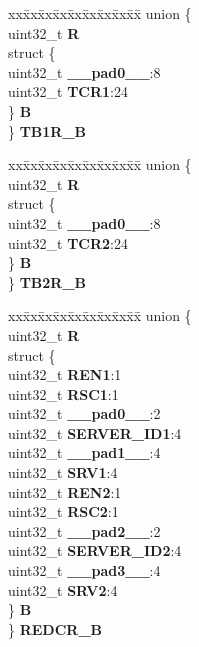 \begin{DoxyCompactItemize}
\begin{tabbing}
\end{tabbing}\item 
\mbox{\label{structETPU__tag_ad5892b6d556deb2c828895ad82ed16f2}} 
\begin{tabbing}
xx\=xx\=xx\=xx\=xx\=xx\=xx\=xx\=xx\=\kill
union \{\\
\>uint32\_t {\bfseries R}\\
\>struct \{\\
\>\>uint32\_t {\bfseries \_\_pad0\_\_}:8\\
\>\>uint32\_t {\bfseries TCR1}:24\\
\>\} {\bfseries B}\\
\} {\bfseries TB1R\_B}\\

\end{tabbing}\item 
\mbox{\label{structETPU__tag_a6dadd98e4b592560b216688b35e47c52}} 
\begin{tabbing}
xx\=xx\=xx\=xx\=xx\=xx\=xx\=xx\=xx\=\kill
union \{\\
\>uint32\_t {\bfseries R}\\
\>struct \{\\
\>\>uint32\_t {\bfseries \_\_pad0\_\_}:8\\
\>\>uint32\_t {\bfseries TCR2}:24\\
\>\} {\bfseries B}\\
\} {\bfseries TB2R\_B}\\

\end{tabbing}\item 
\mbox{\label{structETPU__tag_a0f0a96c409860688ff5b338971293373}} 
\begin{tabbing}
xx\=xx\=xx\=xx\=xx\=xx\=xx\=xx\=xx\=\kill
union \{\\
\>uint32\_t {\bfseries R}\\
\>struct \{\\
\>\>uint32\_t {\bfseries REN1}:1\\
\>\>uint32\_t {\bfseries RSC1}:1\\
\>\>uint32\_t {\bfseries \_\_pad0\_\_}:2\\
\>\>uint32\_t {\bfseries SERVER\_ID1}:4\\
\>\>uint32\_t {\bfseries \_\_pad1\_\_}:4\\
\>\>uint32\_t {\bfseries SRV1}:4\\
\>\>uint32\_t {\bfseries REN2}:1\\
\>\>uint32\_t {\bfseries RSC2}:1\\
\>\>uint32\_t {\bfseries \_\_pad2\_\_}:2\\
\>\>uint32\_t {\bfseries SERVER\_ID2}:4\\
\>\>uint32\_t {\bfseries \_\_pad3\_\_}:4\\
\>\>uint32\_t {\bfseries SRV2}:4\\
\>\} {\bfseries B}\\
\} {\bfseries REDCR\_B}\\


\end{tabbing}
\end{DoxyCompactItemize}
